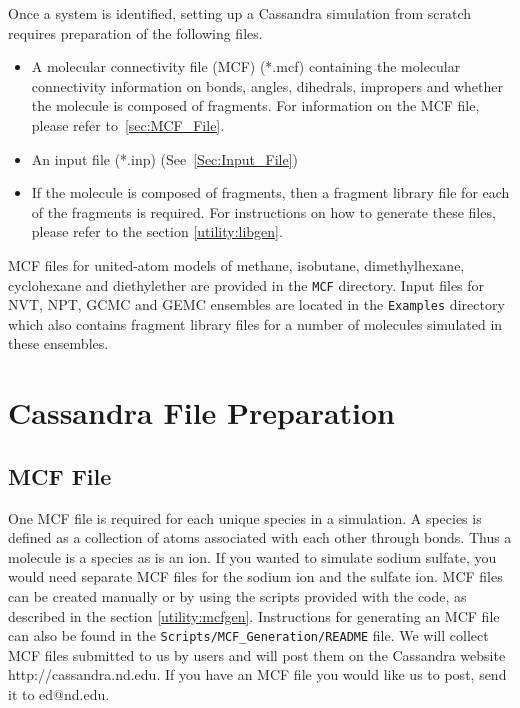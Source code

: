 Once a system is identified, setting up a Cassandra simulation from
scratch requires preparation of the following files. \\

\begin{itemize}
\item A molecular connectivity file (MCF)  (*.mcf) containing the molecular
  connectivity information on bonds, angles, dihedrals, impropers and
  whether the molecule is composed of fragments. For information on
  the MCF file, please refer to~\autoref{sec:MCF_File}.

\item An input file (*.inp) (See~\autoref{Sec:Input_File})

\item If the molecule is composed of fragments, then a fragment library file for each of the fragments is required. For instructions on how to generate these files, please refer to the
section \ref{utility:libgen}.

\end{itemize}
%
MCF files for united-atom models of methane, isobutane, dimethylhexane, cyclohexane and diethylether are provided in the \texttt{MCF} directory. Input files for NVT, NPT, GCMC and GEMC ensembles are located in the \texttt{Examples} directory which also contains fragment library files for a number of molecules simulated in these ensembles. 


\section{Cassandra File Preparation}

\subsection{MCF File}
One MCF file is required for each unique species in a simulation. A
species is defined as a collection of atoms associated with each other
through bonds. Thus a molecule is a species as is an ion. If you
wanted to simulate sodium sulfate, you would need separate MCF files
for the sodium ion and the sulfate ion. MCF files can be created manually 
or by using the scripts provided with the code, as described in
the section \ref{utility:mcfgen}. Instructions for generating an MCF file can also be found in the \texttt{Scripts/MCF\_Generation/README} file. 
We will collect MCF files submitted to us by users and will post them on the Cassandra
website http://cassandra.nd.edu. If you have an MCF file you would
like us to post, send it to ed@nd.edu.
%
%
